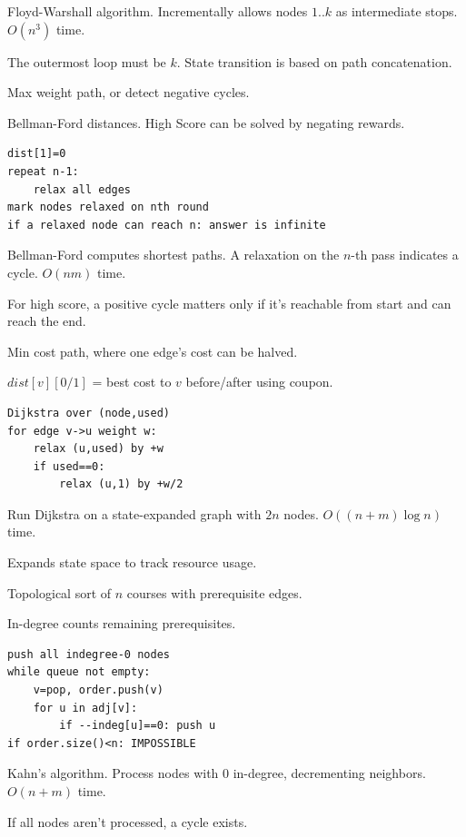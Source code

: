 \Solution Floyd-Warshall algorithm. Incrementally allows nodes $1..k$ as intermediate stops. $O(n^3)$ time.

\Analysis The outermost loop must be $k$. State transition is based on path concatenation.


\Problem Max weight path, or detect negative cycles.

\State Bellman-Ford distances. High Score can be solved by negating rewards.
\begin{lstlisting}
dist[1]=0
repeat n-1:
    relax all edges
mark nodes relaxed on nth round
if a relaxed node can reach n: answer is infinite
\end{lstlisting}

\Solution Bellman-Ford computes shortest paths. A relaxation on the $n$-th pass indicates a cycle. $O(nm)$ time.

\Analysis For high score, a positive cycle matters only if it's reachable from start and can reach the end.


\Problem Min cost path, where one edge's cost can be halved.

\State $dist[v][0/1]$ = best cost to $v$ before/after using coupon.
\begin{lstlisting}
Dijkstra over (node,used)
for edge v->u weight w:
    relax (u,used) by +w
    if used==0:
        relax (u,1) by +w/2
\end{lstlisting}

\Solution Run Dijkstra on a state-expanded graph with $2n$ nodes. $O((n+m)\log n)$ time.

\Analysis Expands state space to track resource usage.


\Problem Topological sort of $n$ courses with prerequisite edges.

\State In-degree counts remaining prerequisites.
\begin{lstlisting}
push all indegree-0 nodes
while queue not empty:
    v=pop, order.push(v)
    for u in adj[v]:
        if --indeg[u]==0: push u
if order.size()<n: IMPOSSIBLE
\end{lstlisting}

\Solution Kahn's algorithm. Process nodes with 0 in-degree, decrementing neighbors. $O(n+m)$ time.

\Analysis If all nodes aren't processed, a cycle exists.

